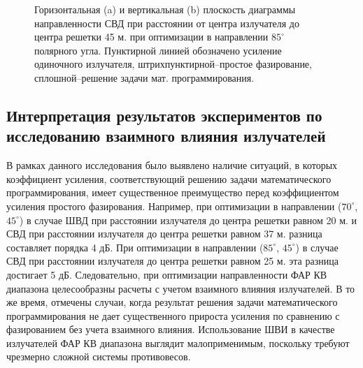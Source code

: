 \begin{figure}
\begin{minipage}[h]{0.49\linewidth}
\end{minipage}
\hfill
\begin{minipage}[h]{0.49\linewidth}
\end{minipage}
\caption{Горизонтальная (a) и вертикальная (b) плоскость диаграммы направленности СВД при расстоянии от центра излучателя до центра решетки 45 м. при оптимизации в направлении $85^{\circ}$ полярного угла. Пунктирной линией обозначено усиление одиночного излучателя, штрихпунктирной--простое фазирование, сплошной--решение задачи мат. программирования.}
\label{ris:svd_mut_5_85_45}
\end{figure}

\subsection{Интерпретация результатов экспериментов по исследованию взаимного влияния излучателей}
В рамках данного исследования было выявлено наличие ситуаций, в которых коэффициент усиления, соответствующий решению задачи математического программирования, имеет существенное преимущество перед коэффициентом усиления простого фазирования. Например, при оптимизации в направлении ($70^{\circ}$, $45^\circ$) в случае ШВД при расстоянии излучателя до центра решетки равном 20 м. и СВД при расстоянии излучателя до центра решетки равном 37 м. разница составляет порядка 4 дБ. При оптимизации в направлении ($85^\circ$, $45^{\circ}$) в случае СВД  при расстоянии излучателя до центра решетки равном 25 м. эта разница достигает 5 дБ. Следовательно, при оптимизации направленности ФАР КВ диапазона целесообразны расчеты с учетом взаимного влияния излучателей. В то же время, отмечены случаи, когда результат решения задачи математического программирования не дает существенного прироста усиления по сравнению с фазированием без учета взаимного влияния.
Использование ШВИ в качестве излучателей ФАР КВ диапазона выглядит малоприменимым, поскольку требуют чрезмерно сложной системы противовесов.
